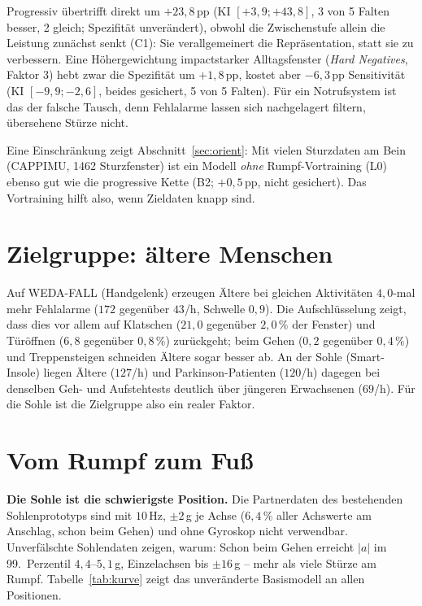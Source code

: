 \documentclass[11pt,a4paper,oneside,parskip=half,open=any,
               numbers=noenddot,listof=totoc,bibliography=totoc]{scrreprt}
\begin{document}
Progressiv übertrifft direkt um $+23{,}8$\,pp (KI $[+3{,}9; +43{,}8]$,
3 von 5 Falten besser, 2 gleich; Spezifität unverändert), obwohl die
Zwischenstufe allein die Leistung zunächst
senkt (C1): Sie verallgemeinert die Repräsentation, statt sie zu
verbessern. Eine Höhergewichtung impactstarker Alltagsfenster
(\emph{Hard Negatives}, Faktor 3) hebt zwar die Spezifität um
$+1{,}8$\,pp, kostet aber $-6{,}3$\,pp Sensitivität (KI
$[-9{,}9; -2{,}6]$, beides gesichert, 5 von 5 Falten). Für ein Notrufsystem ist das der
falsche Tausch, denn Fehlalarme lassen sich nachgelagert filtern,
übersehene Stürze nicht.

Eine Einschränkung zeigt Abschnitt~\ref{sec:orient}: Mit vielen
Sturzdaten am Bein (CAPPIMU, 1462 Sturzfenster) ist ein Modell
\emph{ohne} Rumpf-Vortraining (L0) ebenso gut wie die progressive Kette
(B2; $+0{,}5$\,pp, nicht gesichert). Das Vortraining hilft also, wenn
Zieldaten knapp sind.

\section{Zielgruppe: ältere Menschen}
Auf WEDA-FALL (Handgelenk) erzeugen Ältere bei gleichen Aktivitäten
$4{,}0$-mal mehr Fehlalarme ($172$ gegenüber $43$/h, Schwelle $0{,}9$).
Die Aufschlüsselung zeigt, dass dies vor allem auf Klatschen
($21{,}0$ gegenüber $2{,}0\,\%$ der Fenster) und Türöffnen ($6{,}8$
gegenüber $0{,}8\,\%$) zurückgeht; beim Gehen ($0{,}2$ gegenüber
$0{,}4\,\%$) und Treppensteigen schneiden Ältere sogar besser ab. An der
Sohle (Smart-Insole) liegen Ältere ($127$/h) und Parkinson-Patienten
($120$/h) dagegen bei denselben Geh- und Aufstehtests deutlich über
jüngeren Erwachsenen ($69$/h). Für die Sohle
ist die Zielgruppe also ein realer Faktor.

\section{Vom Rumpf zum Fuß}
\textbf{Die Sohle ist die schwierigste Position.} Die Partnerdaten des
bestehenden Sohlenprototyps sind mit $10$\,Hz, $\pm 2$\,g je Achse
($6{,}4\,\%$ aller Achswerte am Anschlag, schon beim Gehen) und ohne
Gyroskop nicht verwendbar. Unverfälschte
Sohlendaten zeigen, warum: Schon beim Gehen erreicht $|a|$ im
99.~Perzentil $4{,}4$--$5{,}1$\,g, Einzelachsen bis $\pm 16$\,g -- mehr
als viele Stürze am Rumpf. Tabelle~\ref{tab:kurve} zeigt das unveränderte
Basismodell an allen Positionen.
\end{document}
